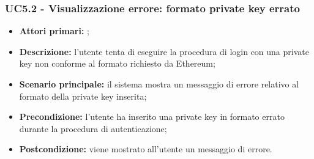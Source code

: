 \subsubsection{UC5.2 - Visualizzazione errore: formato private key errato}
\begin{itemize}
	\item \textbf{Attori primari:} \una{};
	\item \textbf{Descrizione:} l’utente tenta di eseguire la procedura di login con una private key non conforme al formato richiesto da Ethereum; 
	\item \textbf{Scenario principale:} il sistema mostra un messaggio di errore relativo al formato della private key inserita;
	\item \textbf{Precondizione:} l'utente ha inserito una private key in formato errato durante la procedura di autenticazione;
	\item \textbf{Postcondizione:} viene mostrato all’utente un messaggio di errore. 
\end{itemize}